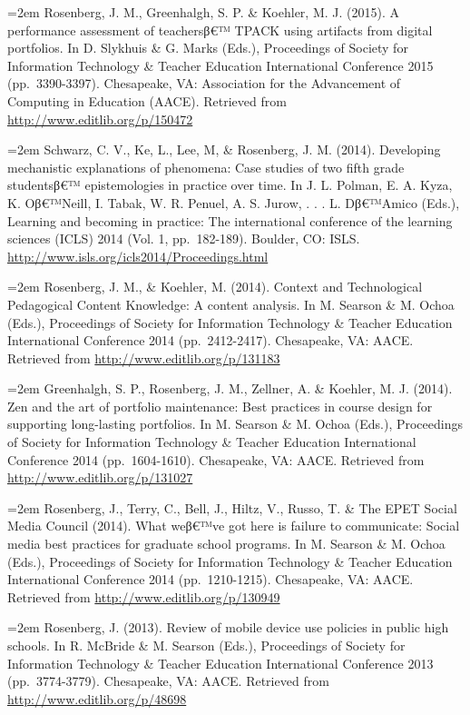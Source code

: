 \documentclass[]{article}
\newcommand{\euro}{€}
\begin{document}
\hangindent=2em Rosenberg, J. M., Greenhalgh, S. P. \& Koehler, M. J.
(2015). A performance assessment of teachersβ\euro{}™ TPACK using
artifacts from digital portfolios. In D. Slykhuis \& G. Marks (Eds.),
Proceedings of Society for Information Technology \& Teacher Education
International Conference 2015 (pp.~3390-3397). Chesapeake, VA:
Association for the Advancement of Computing in Education (AACE).
Retrieved from \url{http://www.editlib.org/p/150472}

\hangindent=2em Schwarz, C. V., Ke, L., Lee, M, \& Rosenberg, J. M.
(2014). Developing mechanistic explanations of phenomena: Case studies
of two fifth grade studentsβ\euro{}™ epistemologies in practice over
time. In J. L. Polman, E. A. Kyza, K. Oβ\euro{}™Neill, I. Tabak, W. R.
Penuel, A. S. Jurow, . . . L. Dβ\euro{}™Amico (Eds.), Learning and
becoming in practice: The international conference of the learning
sciences (ICLS) 2014 (Vol. 1, pp.~182-189). Boulder, CO: ISLS.
\url{http://www.isls.org/icls2014/Proceedings.html}

\hangindent=2em Rosenberg, J. M., \& Koehler, M. (2014). Context and
Technological Pedagogical Content Knowledge: A content analysis. In M.
Searson \& M. Ochoa (Eds.), Proceedings of Society for Information
Technology \& Teacher Education International Conference 2014
(pp.~2412-2417). Chesapeake, VA: AACE. Retrieved from
\url{http://www.editlib.org/p/131183}

\hangindent=2em Greenhalgh, S. P., Rosenberg, J. M., Zellner, A. \&
Koehler, M. J. (2014). Zen and the art of portfolio maintenance: Best
practices in course design for supporting long-lasting portfolios. In M.
Searson \& M. Ochoa (Eds.), Proceedings of Society for Information
Technology \& Teacher Education International Conference 2014
(pp.~1604-1610). Chesapeake, VA: AACE. Retrieved from
\url{http://www.editlib.org/p/131027}

\hangindent=2em Rosenberg, J., Terry, C., Bell, J., Hiltz, V., Russo, T.
\& The EPET Social Media Council (2014). What weβ\euro{}™ve got here is
failure to communicate: Social media best practices for graduate school
programs. In M. Searson \& M. Ochoa (Eds.), Proceedings of Society for
Information Technology \& Teacher Education International Conference
2014 (pp.~1210-1215). Chesapeake, VA: AACE. Retrieved from
\url{http://www.editlib.org/p/130949}

\hangindent=2em Rosenberg, J. (2013). Review of mobile device use
policies in public high schools. In R. McBride \& M. Searson (Eds.),
Proceedings of Society for Information Technology \& Teacher Education
International Conference 2013 (pp.~3774-3779). Chesapeake, VA: AACE.
Retrieved from \url{http://www.editlib.org/p/48698}
\end{document}

